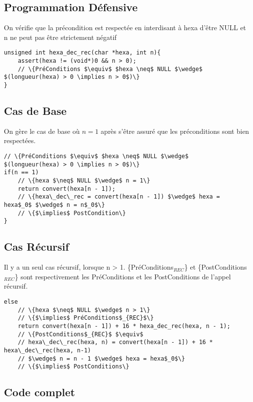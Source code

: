\documentclass[a4paper, 11pt, oneside]{article}
\begin{document}
\subsection{Programmation Défensive}
On vérifie que la précondition est respectée en interdisant à hexa d'être NULL et n ne peut pas être strictement négatif

\begin{lstlisting}
unsigned int hexa_dec_rec(char *hexa, int n){
    assert(hexa != (void*)0 && n > 0);
    // \{PréConditions $\equiv$ $hexa \neq$ NULL $\wedge$  $(longueur(hexa) > 0 \implies n > 0$)\}
}
\end{lstlisting}

\newpage

\subsection{Cas de Base}
On gère le cas de base où $n = 1$ après s'être assuré que les préconditions sont bien respectées.

\begin{lstlisting}
// \{PréConditions $\equiv$ $hexa \neq$ NULL $\wedge$  $(longueur(hexa) > 0 \implies n > 0$)\}
if(n == 1)
    // \{hexa $\neq$ NULL $\wedge$ n = 1\}
    return convert(hexa[n - 1]);
    // \{hexa\_dec\_rec = convert(hexa[n - 1]) $\wedge$ hexa = hexa$_0$ $\wedge$ n = n$_0$\}
    // \{$\implies$ PostCondition\}
}
\end{lstlisting}

\subsection{Cas Récursif}
Il y a un seul cas récursif, lorsque n > 1.
\{PréConditions$_{REC}$\} et \{PostConditions$_{REC}$\} sont respectivement les PréConditions et les PostConditions de l'appel récursif.

\begin{lstlisting}
else
    // \{hexa $\neq$ NULL $\wedge$ n > 1\}
    // \{$\implies$ PréConditions$_{REC}$\}
    return convert(hexa[n - 1]) + 16 * hexa_dec_rec(hexa, n - 1);
    // \{PostConditions$_{REC}$ $\equiv$ 
    // hexa\_dec\_rec(hexa, n) = convert(hexa[n - 1]) + 16 * hexa\_dec\_rec(hexa, n-1)
    // $\wedge$ n = n - 1 $\wedge$ hexa = hexa$_0$\}
    // \{$\implies$ PostConditions\}
\end{lstlisting}

\subsection{Code complet}
\end{document}
